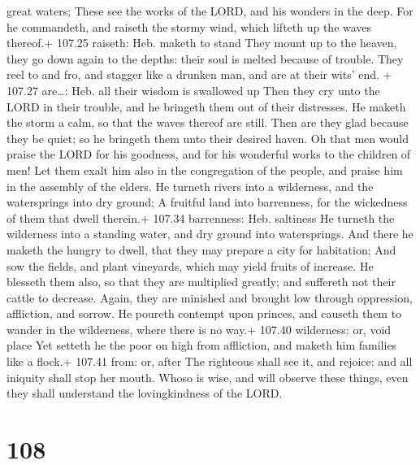 great waters;  These see the works of the LORD, and his
wonders in the deep.  For he commandeth, and raiseth the
stormy wind, which lifteth up the waves thereof.+ 107.25 raiseth: Heb.
maketh to stand  They mount up to the heaven, they go down
again to the depths: their soul is melted because of trouble.
 They reel to and fro, and stagger like a drunken man, and
are at their wits' end. + 107.27 are\ldots: Heb. all their wisdom is
swallowed up  Then they cry unto the LORD in their trouble,
and he bringeth them out of their distresses.  He maketh
the storm a calm, so that the waves thereof are still. 
Then are they glad because they be quiet; so he bringeth them unto their
desired haven.  Oh that men would praise the LORD for his
goodness, and for his wonderful works to the children of men!
 Let them exalt him also in the congregation of the people,
and praise him in the assembly of the elders.  He turneth
rivers into a wilderness, and the watersprings into dry ground;
 A fruitful land into barrenness, for the wickedness of
them that dwell therein.+ 107.34 barrenness: Heb. saltiness
 He turneth the wilderness into a standing water, and dry
ground into watersprings.  And there he maketh the hungry
to dwell, that they may prepare a city for habitation;  And
sow the fields, and plant vineyards, which may yield fruits of increase.
 He blesseth them also, so that they are multiplied
greatly; and suffereth not their cattle to decrease. 
Again, they are minished and brought low through oppression, affliction,
and sorrow.  He poureth contempt upon princes, and causeth
them to wander in the wilderness, where there is no way.+ 107.40
wilderness: or, void place  Yet setteth he the poor on high
from affliction, and maketh him families like a flock.+ 107.41 from: or,
after  The righteous shall see it, and rejoice: and all
iniquity shall stop her mouth.  Whoso is wise, and will
observe these things, even they shall understand the lovingkindness of
the LORD.

\hypertarget{section-107}{%
\section{108}\label{section-107}}

